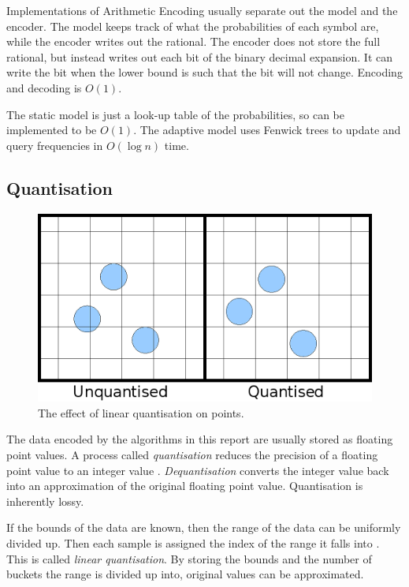\documentclass[a4paper]{report}
\begin{document}
Implementations of Arithmetic Encoding usually separate out the model and the
encoder. The model keeps track of what the probabilities of each symbol are,
while the encoder writes out the rational. The encoder does not store the full
rational, but instead writes out each bit of the binary decimal expansion. It
can write the bit when the lower bound is such that the bit will not
change. Encoding and decoding is $O(1)$.

The static model is just a look-up table of the probabilities, so can be
implemented to be $O(1)$. The adaptive model uses Fenwick trees
\citep{fenwick1994new} to update and query frequencies in $O(\log n)$ time.


\subsection{Quantisation}

\begin{figure}
  \centering
  \includegraphics[width=\textwidth]{images/quantisation}
  \caption{The effect of linear quantisation on points.}
  \label{fig:quant}
\end{figure}

The data encoded by the algorithms in this report are usually stored as
floating point values. A process called \emph{quantisation} reduces the
precision of a floating point value to an integer value
\citep{ag-racm-03}. \emph{Dequantisation} converts the integer value back into
an approximation of the original floating point value. Quantisation is
inherently lossy.

If the bounds of the data are known, then the range of the data can be
uniformly divided up. Then each sample is assigned the index of the range it
falls into \citep{drozdek}. This is called \emph{linear quantisation}. By
storing the bounds and the number of buckets the range is divided up into,
original values can be approximated.
\end{document}
